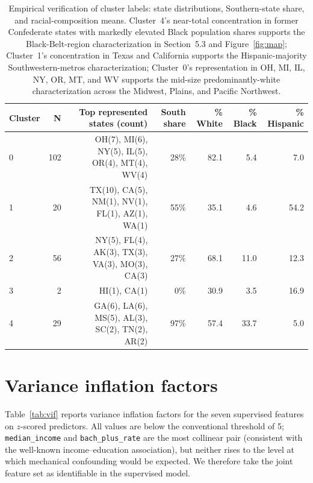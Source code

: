 \documentclass[11pt]{article}
\begin{document}
\begin{table}[!htbp]
\centering
\small
\begin{tabular}{lrrrrrr}
\toprule
Cluster & N & Top represented states (count) & South share & \% White & \% Black & \% Hispanic \\
\midrule
0 & 102 & OH(7), MI(6), NY(5), IL(5), OR(4), MT(4), WV(4) & 28\% & 82.1 & 5.4 & 7.0 \\
1 & \phantom{0}20 & TX(10), CA(5), NM(1), NV(1), FL(1), AZ(1), WA(1) & 55\% & 35.1 & 4.6 & 54.2 \\
2 & \phantom{0}56 & NY(5), FL(4), AK(3), TX(3), VA(3), MO(3), CA(3) & 27\% & 68.1 & 11.0 & 12.3 \\
3 & \phantom{00}2 & HI(1), CA(1) & \phantom{0}0\% & 30.9 & 3.5 & 16.9 \\
4 & \phantom{0}29 & GA(6), LA(6), MS(5), AL(3), SC(2), TN(2), AR(2) & 97\% & 57.4 & 33.7 & 5.0 \\
\bottomrule
\end{tabular}
\caption{Empirical verification of cluster labels: state distributions, Southern-state share, and racial-composition means. Cluster~4's near-total concentration in former Confederate states with markedly elevated Black population shares supports the Black-Belt-region characterization in Section~5.3 and Figure~\ref{fig:map}; Cluster~1's concentration in Texas and California supports the Hispanic-majority Southwestern-metros characterization; Cluster~0's representation in OH, MI, IL, NY, OR, MT, and WV supports the mid-size predominantly-white characterization across the Midwest, Plains, and Pacific Northwest.}
\label{tab:clusterverify}
\end{table}

\section{Variance inflation factors}
\label{sec:appimport}

Table~\ref{tab:vif} reports variance inflation factors for the seven supervised features on $z$-scored predictors. All values are below the conventional threshold of 5; \texttt{median\_income} and \texttt{bach\_plus\_rate} are the most collinear pair (consistent with the well-known income--education association), but neither rises to the level at which mechanical confounding would be expected. We therefore take the joint feature set as identifiable in the supervised model.
\end{document}
